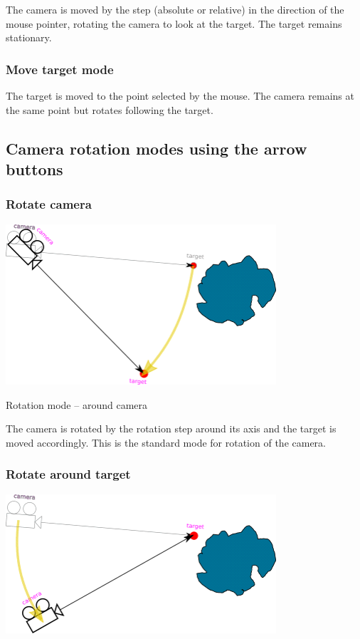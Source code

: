 The camera is moved by the step (absolute or relative) in the direction
of the mouse pointer, rotating the camera to look at the target. The
target remains stationary.

\subsubsection{Move target mode}\label{move-target-mode-1}

The target is moved to the point selected by the mouse. The camera
remains at the same point but rotates following the target.

\subsection{Camera rotation modes using the arrow
buttons}\label{camera-rotation-modes-using-the-arrow-buttons}

\subsubsection{Rotate camera}\label{rotate-camera}

\includegraphics[width=3.95347in,height=2.34861in]{img/manual/media/image14.png}

Rotation mode -- around camera

The camera is rotated by the rotation step around its axis and the
target is moved accordingly. This is the standard mode for rotation of
the camera.

\subsubsection{Rotate around target}\label{rotate-around-target}

\includegraphics[width=3.95347in,height=2.03472in]{img/manual/media/image15.png}

